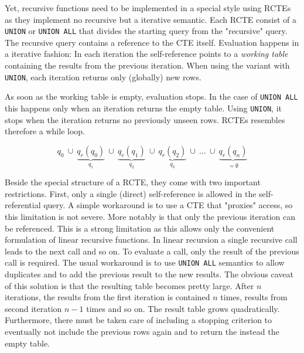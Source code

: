 Yet, recursive functions need to be implemented in a special style using RCTEs as they implement no recursive but a iterative semantic. Each RCTE consist of a \texttt{UNION} or \texttt{UNION ALL} that divides the starting query from the "recursive" query. The recursive query contains a reference to the CTE itself. Evaluation happens in a iterative fashion: In each iteration the self-reference points to a \textit{working table} containing the results from the previous iteration. When using the variant with \texttt{UNION}, each iteration returns only (globally) new rows.

As soon as the working table is empty, evaluation stops. In the case of \texttt{UNION ALL} this happens only when an iteration returns the empty table. Using \texttt{UNION}, it stops when the iteration returns no previously unseen rows. RCTEs resembles therefore a while loop.

$$
q_0 ~\cup ~\underbrace{q_r(q_0)}_{q_1} ~\cup~ \underbrace{q_r(q_1)}_{q_2}~ \cup~\underbrace{q_r(q_2)}_{q_3}~ \cup ~\hdots ~ \cup ~ \underbrace{q_r(q_n)}_{= \emptyset}
$$

Beside the special structure of a RCTE, they come with two important restrictions. First, only a single (direct) self-reference is allowed in the self-referential query. A simple workaround is to use a CTE that "proxies" access, so this limitation is not severe. More notably is that only the previous iteration can be referenced. This is a strong limitation as this allows only the convenient formulation of linear recursive functions. In linear recursion a single recursive call leads to the next call and so on. To evaluate a call, only the result of the previous call is required. The usual workaround is to use \texttt{UNION ALL} semantics to allow duplicates and to add the previous result to the new results. The obvious caveat of this solution is that the resulting table becomes pretty large. After $n$ iterations, the results from the first iteration is contained $n$ times, results from second iteration $n-1$ times and so on. The result table grows quadratically. Furthermore, there must be taken care of including a stopping criterion to eventually not include the previous rows again and to return the instead the empty table.
